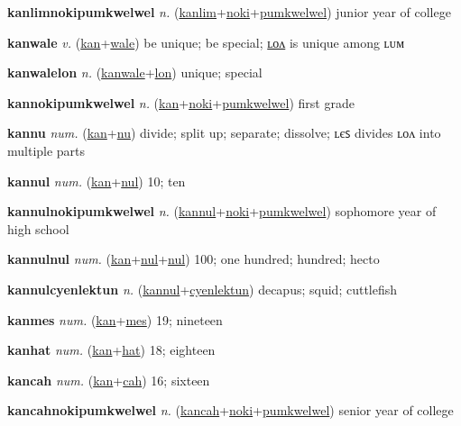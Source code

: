 \textbf{\hypertarget{kanlimnokipumkwelwel}{kanlimnokipumkwelwel}} \textit{n.} (\hyperlink{kanlim}{kanlim}+\allowbreak \hyperlink{noki}{noki}+\allowbreak \hyperlink{pumkwelwel}{pumkwelwel})
junior year of college

\textbf{\hypertarget{kanwale}{kanwale}} \textit{v.} (\hyperlink{kan}{kan}+\allowbreak \hyperlink{wale}{wale})
be unique; be special; \hyperlink{kanwalelon}{ʟᴏᴧ} is unique among ʟᴜᴍ

\textbf{\hypertarget{kanwalelon}{kanwalelon}} \textit{n.} (\hyperlink{kanwale}{kanwale}+\allowbreak \hyperlink{lon}{lon})
unique; special

\textbf{\hypertarget{kannokipumkwelwel}{kannokipumkwelwel}} \textit{n.} (\hyperlink{kan}{kan}+\allowbreak \hyperlink{noki}{noki}+\allowbreak \hyperlink{pumkwelwel}{pumkwelwel})
first grade

\textbf{\hypertarget{kannu}{kannu}} \textit{num.} (\hyperlink{kan}{kan}+\allowbreak \hyperlink{nu}{nu})
divide; split up; separate; dissolve; ʟєꜱ divides ʟᴏᴧ into multiple parts

\textbf{\hypertarget{kannul}{kannul}} \textit{num.} (\hyperlink{kan}{kan}+\allowbreak \hyperlink{nul}{nul})
10; ten

\textbf{\hypertarget{kannulnokipumkwelwel}{kannulnokipumkwelwel}} \textit{n.} (\hyperlink{kannul}{kannul}+\allowbreak \hyperlink{noki}{noki}+\allowbreak \hyperlink{pumkwelwel}{pumkwelwel})
sophomore year of high school

\textbf{\hypertarget{kannulnul}{kannulnul}} \textit{num.} (\hyperlink{kan}{kan}+\allowbreak \hyperlink{nul}{nul}+\allowbreak \hyperlink{nul}{nul})
100; one hundred; hundred; hecto

\textbf{\hypertarget{kannulcyenlektun}{kannulcyenlektun}} \textit{n.} (\hyperlink{kannul}{kannul}+\allowbreak \hyperlink{cyenlektun}{cyenlektun})
decapus; squid; cuttlefish

\textbf{\hypertarget{kanmes}{kanmes}} \textit{num.} (\hyperlink{kan}{kan}+\allowbreak \hyperlink{mes}{mes})
19; nineteen

\textbf{\hypertarget{kanhat}{kanhat}} \textit{num.} (\hyperlink{kan}{kan}+\allowbreak \hyperlink{hat}{hat})
18; eighteen

\textbf{\hypertarget{kancah}{kancah}} \textit{num.} (\hyperlink{kan}{kan}+\allowbreak \hyperlink{cah}{cah})
16; sixteen

\textbf{\hypertarget{kancahnokipumkwelwel}{kancahnokipumkwelwel}} \textit{n.} (\hyperlink{kancah}{kancah}+\allowbreak \hyperlink{noki}{noki}+\allowbreak \hyperlink{pumkwelwel}{pumkwelwel})
senior year of college

